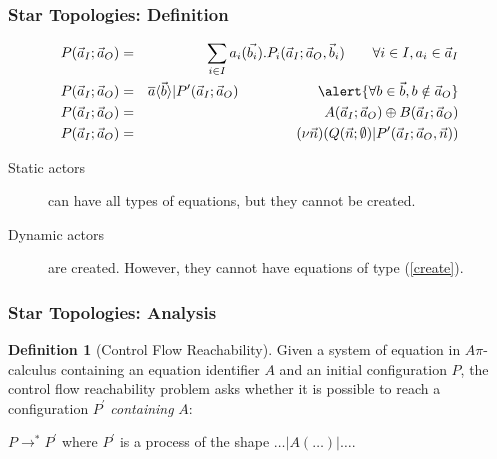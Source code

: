 \documentclass{beamer}
\theoremstyle{remark}
\theoremstyle{definition}
\newtheorem{define}[thm]{Definition}
\begin{document}
\begin{frame}
\frametitle{Star Topologies: Definition}
\begin{eqnarray}
P(\vec a_I; \vec a_O) & = & \sum_{i \in I} a_i (\vec{b_i}).P_i(\vec a_I ;\vec a_O, \vec b_i) \hspace{7mm} \forall i \in I, a_i \in \vec a_I \\
P(\vec a_I; \vec a_O) & = & \overline{a}\langle \vec{b} \rangle | P^\prime(\vec a_I ;\vec a_O) \hspace{20mm} \alert{\forall b \in \vec b, b \notin \vec a_O} \\
P(\vec a_I; \vec a_O) & = & A(\vec a_I; \vec a_O) \oplus B(\vec a_I; \vec a_O) \\
\label{create} P(\vec a_I; \vec a_O) & = & (\nu \vec n)(Q(\vec n;\emptyset) | P^\prime(\vec a_I ; \vec a_O , \vec n)) 
\end{eqnarray}

\vspace{10pt}

\begin{description}
\item[Static actors] can have all types of equations, but they cannot be created.
\item[Dynamic actors] are created. However, they cannot have equations of type (\ref{create}).
\end{description}
\end{frame}

\begin{frame}
\frametitle{Star Topologies: Analysis}


\begin{define}[Control Flow Reachability]
Given a system of equation in $A\pi$-calculus containing an equation identifier $A$ and an initial configuration $P$,
the control flow reachability problem asks whether it is possible to reach a configuration $P^\prime$ \emph{containing} $A$:

$P \rightarrow^* P^\prime$ where $P^\prime$ is a process of the shape $\ldots | A(\ldots) | \ldots$.
\end{define}

\end{frame}
\end{document}
